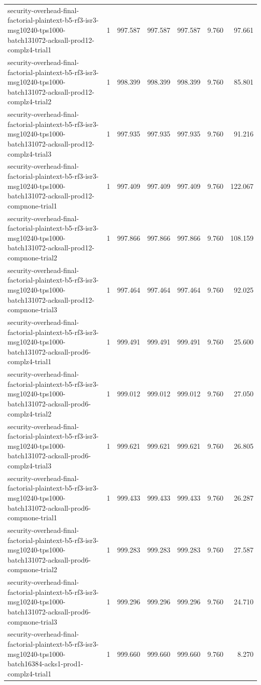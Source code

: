 \begin{tabular}{lrrrrrr}
security-overhead-final-factorial-plaintext-b5-rf3-isr3-msg10240-tps1000-batch131072-acksall-prod12-complz4-trial1 & 1 & 997.587 & 997.587 & 997.587 & 9.760 & 97.661 \\
security-overhead-final-factorial-plaintext-b5-rf3-isr3-msg10240-tps1000-batch131072-acksall-prod12-complz4-trial2 & 1 & 998.399 & 998.399 & 998.399 & 9.760 & 85.801 \\
security-overhead-final-factorial-plaintext-b5-rf3-isr3-msg10240-tps1000-batch131072-acksall-prod12-complz4-trial3 & 1 & 997.935 & 997.935 & 997.935 & 9.760 & 91.216 \\
security-overhead-final-factorial-plaintext-b5-rf3-isr3-msg10240-tps1000-batch131072-acksall-prod12-compnone-trial1 & 1 & 997.409 & 997.409 & 997.409 & 9.760 & 122.067 \\
security-overhead-final-factorial-plaintext-b5-rf3-isr3-msg10240-tps1000-batch131072-acksall-prod12-compnone-trial2 & 1 & 997.866 & 997.866 & 997.866 & 9.760 & 108.159 \\
security-overhead-final-factorial-plaintext-b5-rf3-isr3-msg10240-tps1000-batch131072-acksall-prod12-compnone-trial3 & 1 & 997.464 & 997.464 & 997.464 & 9.760 & 92.025 \\
security-overhead-final-factorial-plaintext-b5-rf3-isr3-msg10240-tps1000-batch131072-acksall-prod6-complz4-trial1 & 1 & 999.491 & 999.491 & 999.491 & 9.760 & 25.600 \\
security-overhead-final-factorial-plaintext-b5-rf3-isr3-msg10240-tps1000-batch131072-acksall-prod6-complz4-trial2 & 1 & 999.012 & 999.012 & 999.012 & 9.760 & 27.050 \\
security-overhead-final-factorial-plaintext-b5-rf3-isr3-msg10240-tps1000-batch131072-acksall-prod6-complz4-trial3 & 1 & 999.621 & 999.621 & 999.621 & 9.760 & 26.805 \\
security-overhead-final-factorial-plaintext-b5-rf3-isr3-msg10240-tps1000-batch131072-acksall-prod6-compnone-trial1 & 1 & 999.433 & 999.433 & 999.433 & 9.760 & 26.287 \\
security-overhead-final-factorial-plaintext-b5-rf3-isr3-msg10240-tps1000-batch131072-acksall-prod6-compnone-trial2 & 1 & 999.283 & 999.283 & 999.283 & 9.760 & 27.587 \\
security-overhead-final-factorial-plaintext-b5-rf3-isr3-msg10240-tps1000-batch131072-acksall-prod6-compnone-trial3 & 1 & 999.296 & 999.296 & 999.296 & 9.760 & 24.710 \\
security-overhead-final-factorial-plaintext-b5-rf3-isr3-msg10240-tps1000-batch16384-acks1-prod1-complz4-trial1 & 1 & 999.660 & 999.660 & 999.660 & 9.760 & 8.270 \\

\end{tabular}

